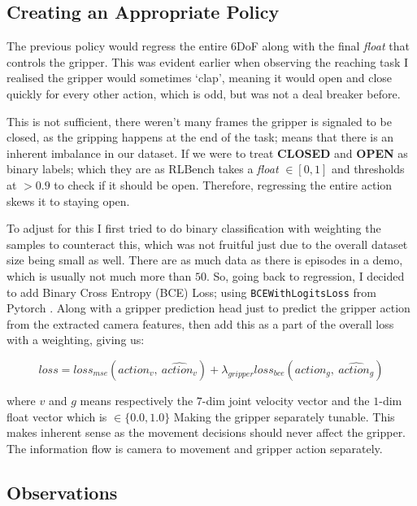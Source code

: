 \subsection{Creating an Appropriate Policy}
The previous policy would regress the entire 6DoF along with the final \emph{float} that controls the gripper. This was evident earlier when observing the reaching task I realised the gripper would sometimes `clap', meaning it would open and close quickly for every other action, which is odd, but was not a deal breaker before.

This is not sufficient, there weren't many frames the gripper is signaled to be closed, as the gripping happens at the end of the task; means that there is an inherent imbalance in our dataset. If we were to treat \textbf{CLOSED} and \textbf{OPEN} as binary labels; which they are as RLBench takes a \emph{float} $\in \left[0, 1\right]$ and thresholds at $ > 0.9$ to check if it should be open. Therefore, regressing the entire action skews it to staying open.

To adjust for this I first tried to do binary classification with weighting the samples to counteract this, which was not fruitful just due to the overall dataset size being small as well. There are as much data as there is episodes in a demo, which is usually not much more than $50$. So, going back to regression, I decided to add Binary Cross Entropy (BCE) Loss; using \verb|BCEWithLogitsLoss| from Pytorch \cite{pytorch}. Along with a gripper prediction head just to predict the gripper action from the extracted camera features, then add this as a part of the overall loss with a weighting, giving us:

\[
  loss = loss_{mse} \left(action_{v}, ~\widehat{action_v}\right) 
  + 
  \lambda_{gripper} loss_{bce}\left( action_{g}, ~\widehat{action_g}\right)
\]

where $v$ and $g$ means respectively the $7$-dim joint velocity vector and the $1$-dim float vector which is \( \in \{ 0.0, 1.0 \}\) Making the gripper separately tunable. This makes inherent sense as the movement decisions should never affect the gripper. The information flow is camera to movement and gripper action separately.

\subsection{Observations}

